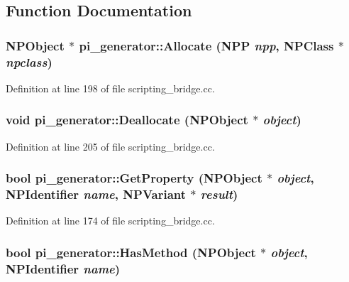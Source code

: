 \subsection{Function Documentation}
\hypertarget{namespacepi__generator_a94f67bed2d50304566aa1f7c35f91ab2}{
\subsubsection[{Allocate}]{\setlength{\rightskip}{0pt plus 5cm}NPObject $\ast$ pi\_\-generator::Allocate ({\bf NPP} {\em npp}, \/  NPClass $\ast$ {\em npclass})}}
\label{namespacepi__generator_a94f67bed2d50304566aa1f7c35f91ab2}


Definition at line 198 of file scripting\_\-bridge.cc.

\hypertarget{namespacepi__generator_a36cb8ad170a393eedf2f477fa7561f62}{
\subsubsection[{Deallocate}]{\setlength{\rightskip}{0pt plus 5cm}void pi\_\-generator::Deallocate (NPObject $\ast$ {\em object})}}
\label{namespacepi__generator_a36cb8ad170a393eedf2f477fa7561f62}


Definition at line 205 of file scripting\_\-bridge.cc.

\hypertarget{namespacepi__generator_aa945b983b43a437de8e06ebbbe8f6064}{
\subsubsection[{GetProperty}]{\setlength{\rightskip}{0pt plus 5cm}bool pi\_\-generator::GetProperty (NPObject $\ast$ {\em object}, \/  NPIdentifier {\em name}, \/  NPVariant $\ast$ {\em result})}}
\label{namespacepi__generator_aa945b983b43a437de8e06ebbbe8f6064}


Definition at line 174 of file scripting\_\-bridge.cc.

\hypertarget{namespacepi__generator_a952c6436fb4cc8d87e830f81f3bae284}{
\subsubsection[{HasMethod}]{\setlength{\rightskip}{0pt plus 5cm}bool pi\_\-generator::HasMethod (NPObject $\ast$ {\em object}, \/  NPIdentifier {\em name})}}
\label{namespacepi__generator_a952c6436fb4cc8d87e830f81f3bae284}



